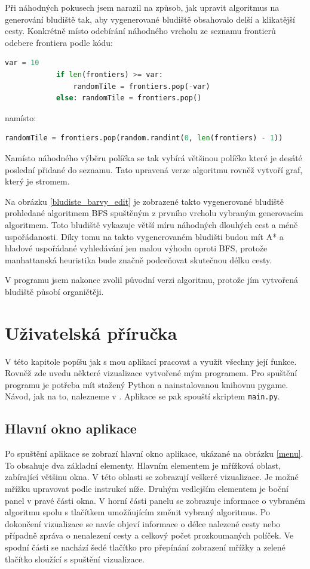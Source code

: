 \documentclass[12pt]{report}			%
\begin{document}
		
		Při náhodných pokusech jsem narazil na způsob, jak upravit algoritmus na generování bludiště tak, aby vygenerované bludiště obsahovalo delší a klikatější cesty. Konkrétně místo odebírání náhodného vrcholu ze seznamu frontierů odebere frontiera podle kódu:
		\begin{lstlisting}[language = Python]
            var = 10
            if len(frontiers) >= var:
                randomTile = frontiers.pop(-var)
            else: randomTile = frontiers.pop()
		\end{lstlisting}
		namísto:
				\begin{lstlisting}[language = Python]
randomTile = frontiers.pop(random.randint(0, len(frontiers) - 1))
		\end{lstlisting}
		Namísto náhodného výběru políčka se tak vybírá většinou políčko které je desáté poslední přidané do seznamu.
		Tato upravená verze algoritmu rovněž vytvoří graf, který je stromem.
		
		Na obrázku \ref{bludiste_barvy_edit} je zobrazené takto vygenerované bludiště prohledané algoritmem BFS spuštěným z prvního vrcholu vybraným generovacím algoritmem. Toto bludiště vykazuje větší míru náhodných dlouhých cest a méně uspořádanosti. Díky tomu na takto vygenerovaném bludišti budou mít A* a hladové uspořádané vyhledávání jen malou výhodu oproti BFS, protože manhattanská heuristika bude značně podceňovat skutečnou délku cesty.
		
		V programu jsem nakonec zvolil původní verzi algoritmu, protože jím vytvořená bludiště působí organičtěji.
		\chapter{Uživatelská příručka}
		V této kapitole popíšu jak s mou aplikací pracovat a využít všechny její funkce. Rovněž zde uvedu některé vizualizace vytvořené mým programem. Pro spuštění programu je potřeba mít stažený Python a nainstalovanou knihovnu pygame. Návod, jak na to, nalezneme v \cite{pygame_getting_started}. Aplikace se pak spouští skriptem \texttt{main.py}.
		
			\section{Hlavní okno aplikace}
						Po spuštění aplikace se zobrazí hlavní okno aplikace, ukázané na obrázku \ref{menu}. To obsahuje dva základní elementy. Hlavním elementem je mřížková oblast, zabírající většinu okna. V této oblasti se zobrazují veškeré vizualizace. Je možné mřížku upravovat podle instrukcí níže. Druhým vedlejším elementem je boční panel v pravé části okna. V horní části panelu se zobrazuje informace o vybraném algoritmu spolu s tlačítkem umožňujícím změnit vybraný algoritmus. Po dokončení vizualizace se navíc objeví informace o délce nalezené cesty nebo případně zpráva o nenalezení cesty a celkový počet prozkoumaných políček. Ve spodní části se nachází šedé tlačítko pro přepínání zobrazení mřížky a zelené tlačítko sloužící s spuštění vizualizace. 
						
\end{document}
